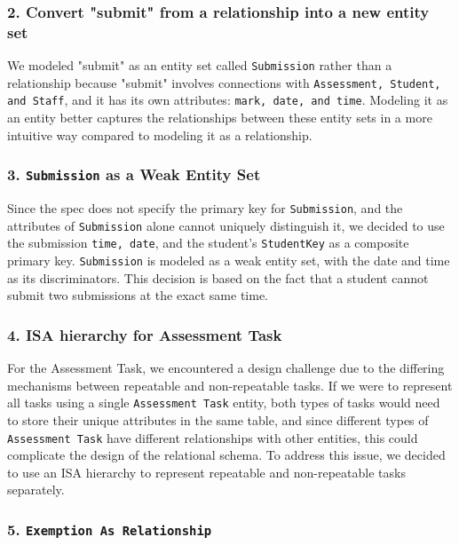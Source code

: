 \documentclass[12pt]{article}
\begin{document}
\subsubsection*{2. Convert "submit" from a relationship into a new entity set}

We modeled "submit" as an entity set called \texttt{Submission} rather than a relationship because "submit" involves connections with \texttt{Assessment, Student, and Staff}, and it has its own attributes: \texttt{mark, date, and time}. Modeling it as an entity better captures the relationships between these entity sets in a more intuitive way compared to modeling it as a relationship.

\subsubsection*{3. \texttt{Submission} as a Weak Entity Set}
Since the spec does not specify the primary key for \texttt{Submission}, and the attributes of \texttt{Submission} alone cannot uniquely distinguish it, we decided to use the submission \texttt{time, date}, and the student's \texttt{StudentKey} as a composite primary key. \texttt{Submission} is modeled as a weak entity set, with the date and time as its discriminators. This decision is based on the fact that a student cannot submit two submissions at the exact same time.

\subsubsection*{4. ISA hierarchy for Assessment Task}

For the Assessment Task, we encountered a design challenge due to the differing mechanisms between repeatable and non-repeatable tasks. If we were to represent all tasks using a single \texttt{Assessment Task} entity, both types of tasks would need to store their unique attributes in the same table, and since different types of \texttt{Assessment Task} have different relationships with other entities, this could complicate the design of the relational schema. To address this issue, we decided to use an ISA hierarchy to represent repeatable and non-repeatable tasks separately.

\subsubsection*{5. \texttt{Exemption As Relationship}}
\end{document}
